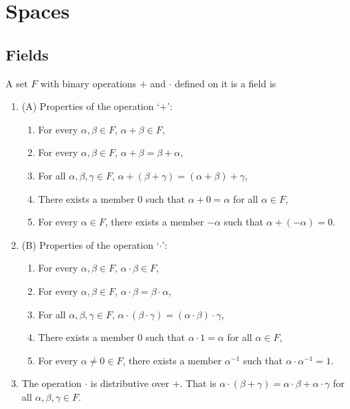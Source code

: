 \chapter{Spaces}\label{c1}
\section{Fields}\label{c1s1}
\begin{defn}\label{c1s1d1}
A set $F$ with binary operations $+$ and $\cdot$ defined on it is a
field is
\begin{enumerate}
\item (A) Properties of the operation `$+$':
\begin{enumerate}
\item For every $\alpha, \beta \in F$, $\alpha + \beta \in F$,
\item For every $\alpha, \beta \in F$, $\alpha + \beta = \beta +
\alpha$,
\item For all $\alpha, \beta, \gamma \in F$, $\alpha + (\beta + 
\gamma) = (\alpha + \beta) + \gamma$,
\item There exists a member $0$ such that $\alpha + 0 = \alpha$ for
all $\alpha \in F$,
\item For every $\alpha \in F$, there exists a member $-\alpha$
such that $\alpha + (-\alpha) = 0$.
\end{enumerate}
\item (B) Properties of the operation `$\cdot$':
\begin{enumerate}
\item For every $\alpha, \beta \in F$, $\alpha \cdot \beta \in F$,
\item For every $\alpha, \beta \in F$, $\alpha \cdot \beta = \beta 
\cdot \alpha$,
\item For all $\alpha, \beta, \gamma \in F$, $\alpha \cdot (\beta 
\cdot \gamma) = (\alpha \cdot \beta) \cdot \gamma$,
\item There exists a member $0$ such that $\alpha \cdot 1 = \alpha$ for
all $\alpha \in F$,
\item For every $\alpha \ne 0 \in F$, there exists a member 
$\alpha^{-1}$ such that $\alpha \cdot \alpha^{-1} = 1$.
\end{enumerate}
\item The operation $\cdot$ is distributive over $+$. That is $\alpha
\cdot (\beta + \gamma) = \alpha \cdot \beta + \alpha \cdot \gamma$
for all $\alpha, \beta, \gamma \in F$.
\end{enumerate}
\end{defn}

